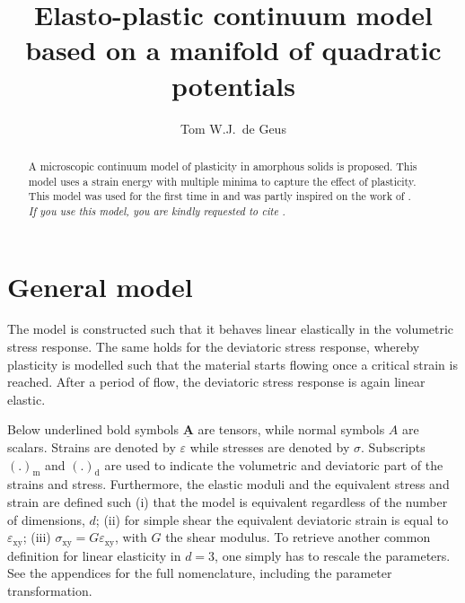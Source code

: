 \documentclass[fleqn, colorlinks]{goose-article}
\title{%
    Elasto-plastic continuum model
    based on a manifold of quadratic potentials
}
\author{Tom W.J.\ de Geus}
\newcommand\T[1]{\underline{\bm{{#1}}}}
\begin{document}
\maketitle

\begin{abstract}
\noindent
A microscopic continuum model of plasticity in amorphous solids is proposed.
This model uses a strain energy with multiple minima to capture the effect of plasticity.
This model was used for the first time in \citet{DeGeus2019}
and was partly inspired on the work of \citet{Jagla2017}.
\\

\noindent
\emph{If you use this model, you are kindly requested to cite \cite{DeGeus2019}.}
\\

\end{abstract}

\setcounter{tocdepth}{3}
\tableofcontents

\vfill\newpage
\section{General model}

The model is constructed such that it behaves linear elastically in the volumetric stress response.
The same holds for the deviatoric stress response, whereby plasticity is modelled
such that the material starts flowing once a critical strain is reached.
After a period of flow, the deviatoric stress response is again linear elastic.

Below underlined bold symbols $\T{A}$ are tensors, while normal symbols $A$ are scalars.
Strains are denoted by $\varepsilon$ while stresses are denoted by $\sigma$.
Subscripts $(.)_\mathrm{m}$ and $(.)_\mathrm{d}$ are used to indicate the
volumetric and deviatoric part of the strains and stress.
Furthermore, the elastic moduli and the equivalent stress and strain are defined such
(i) that the model is equivalent regardless of the number of dimensions, $d$;
(ii) for simple shear the equivalent deviatoric strain is equal to $\varepsilon_\mathrm{xy}$;
(iii) $\sigma_\mathrm{xy} = G \varepsilon_\mathrm{xy}$, with $G$ the shear modulus.
To retrieve another common definition for linear elasticity in $d = 3$,
one simply has to rescale the parameters.
See the appendices for the full nomenclature, including the parameter transformation.
\end{document}
